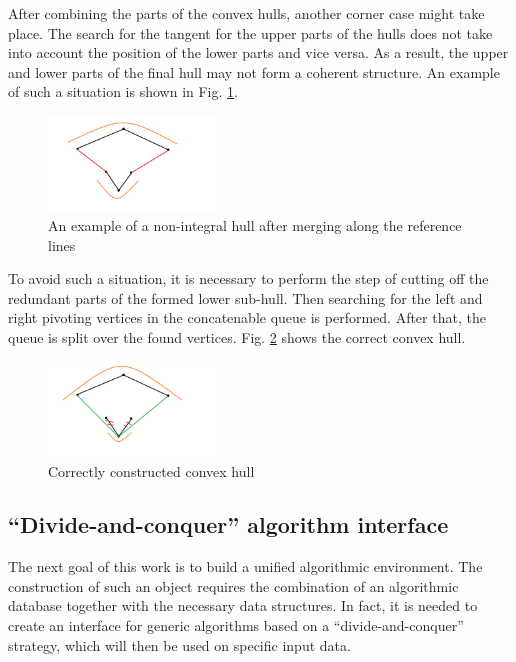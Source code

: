 \documentclass[conference]{IEEEtran}
\begin{document}
	After combining the parts of the convex hulls, another corner case might take place. The search for the tangent for the upper parts of the hulls does not take into account the position of the lower parts and vice versa. As a result, the upper and lower parts of the final hull may not form a coherent structure. An example of such a situation is shown in Fig. \ref{fig:incorect_lower_subhull}.
	
	\begin{figure}[t]
		\centering
		\includegraphics[width=0.4\textwidth, height=0.2\textheight]{incorect_lower_subhull}
		\caption{An example of a non-integral hull after merging along the reference lines}
		\label{fig:incorect_lower_subhull}
	\end{figure}
	
	To avoid such a situation, it is necessary to perform the step of cutting off the redundant parts of the formed lower sub-hull. Then searching for the left and right pivoting vertices in the concatenable queue is performed. After that, the queue is split over the found vertices. Fig. \ref{fig:correct_convex_hull} shows the correct convex hull.
	
	\begin{figure}[t]
		\centering
		\includegraphics[width=0.4\textwidth, height=0.2\textheight]{correct_convex_hull}
		\caption{Correctly constructed convex hull}
		\label{fig:correct_convex_hull}
	\end{figure}

\subsection{``Divide-and-conquer'' algorithm interface}

	The next goal of this work is to build a unified algorithmic environment. The construction of such an object requires the combination of an algorithmic database together with the necessary data structures.  In fact, it is needed to create an interface for generic algorithms based on a ``divide-and-conquer'' strategy, which will then be used on specific input data.
	
\end{document}
